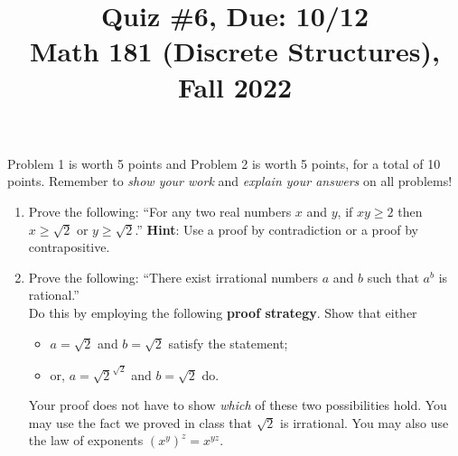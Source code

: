 \documentclass[11pt]{article}
\title{Quiz \#6, Due: 10/12 \\Math 181 (Discrete Structures), Fall 2022}
\date{}
\begin{document}
\maketitle

\thispagestyle{empty}

\vspace{-1cm}

Problem 1 is worth 5 points and Problem 2 is worth 5 points, for a total of 10 points. Remember to \emph{show your work} and \emph{explain your answers} on all problems!

\begin{enumerate}
\item Prove the following: ``For any two real numbers $x$ and $y$, if $xy \geq 2$ then $x \geq \sqrt{2}$ or $y \geq \sqrt{2}$.'' {\bf Hint}: Use a proof by contradiction or a proof by contrapositive.

\item Prove the following: ``There exist irrational numbers $a$ and $b$ such that $a^b$ is rational.'' \\ Do this by employing the following {\bf proof strategy}. Show that either
\begin{itemize} 
\item $a=\sqrt{2}$ and $b=\sqrt{2}$ satisfy the statement;
\item or, $a=\sqrt{2}^{\sqrt{2}}$ and $b=\sqrt{2}$ do.
\end{itemize}
Your proof does not have to show \emph{which} of these two possibilities hold. You may use the fact we proved in class that $\sqrt{2}$ is irrational. You may also use the law of exponents $(x^y)^{z}= x^{yz}$.
\end{enumerate}
\end{document}
